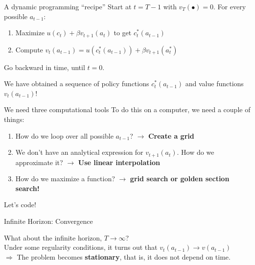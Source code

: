 \documentclass[
  10pt,
  ignorenonframetext,
  aspectratio=43,
  english,
  handout]{beamer}
\providecommand{\tightlist}{%
  \setlength{\itemsep}{0pt}\setlength{\parskip}{0pt}}
\begin{document}
\begin{frame}{A dynamic programming ``recipe''}
\protect{}\label{a-dynamic-programming-recipe}
Start at \(t=T-1\) with \(v_{T}(\bullet)=0\). For every possible
\(a_{t-1}\):

\begin{enumerate}
\tightlist
\item Maximize \(u(c_t)+ \beta v_{t+1}(a_{t})\) to get \(c_t^{\ast}(a_{t-1})\)
\item Compute \(v_t(a_{t-1})=u(c_{t}^{\ast}(a_{t-1}))+\beta v_{t+1}(a_{t}^{\ast})\)
\end{enumerate}

Go backward in time, until \(t=0\).

We have obtained a sequence of policy functions \(c_t^{\ast}(a_{t-1})\) and value functions \(v_t(a_{t-1})\)!
\end{frame}

\begin{frame}{We need three computational tools}
\protect{}\label{we-need-three-computational-tools}
To do this on a computer, we need a couple of things: \vspace{5mm}

\begin{enumerate}
\tightlist
\item How do we loop over all possible \(a_{t-1}\)? $\to$ \textbf{Create a grid}
\item We don't have an analytical expression for \(v_{t+1}(a_t)\). How do we approximate it? $\to$ \textbf{Use linear interpolation}
\item How do we maximize a function? $\to$ \textbf{grid search or golden section search!}
\end{enumerate}
\end{frame}

\begin{frame}{}
\protect{}\label{section-1}
\begin{center}
\LARGE Let's code!
\end{center}
\end{frame}

\begin{frame}{Infinite Horizon: Convergence}
\protect{}\label{infinite-horizon-convergence}

What about the infinite horizon, \(T\rightarrow\infty\)?\\

Under some regularity conditions, it turns out that \(v_t(a_{t-1})\to v(a_{t-1})\)\\

\(\Rightarrow\) The problem becomes \textbf{stationary}, that is, it does not depend on time.
\end{frame}
\end{document}
